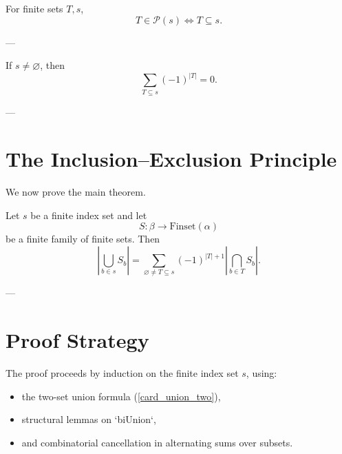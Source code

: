 \begin{lemma}\label{mem_powerset}
For finite sets \(T,s\),
\[
T \in \mathcal P(s)
\iff
T \subseteq s.
\]
\end{lemma}


---

\begin{lemma}\label{alternating_sum_powerset}
If \(s \neq \varnothing\), then
\[
\sum_{T \subseteq s} (-1)^{|T|}
=
0.
\]
\end{lemma}


---

\section{The Inclusion--Exclusion Principle}

We now prove the main theorem.

\begin{theorem}\label{inclusion_exclusion}
Let \(s\) be a finite index set and let
\[
S : \beta \to \mathrm{Finset}(\alpha)
\]
be a finite family of finite sets. Then
\[
\left|
\bigcup_{b \in s} S_b
\right|
=
\sum_{\varnothing \neq T \subseteq s}
(-1)^{|T|+1}
\left|
\bigcap_{b \in T} S_b
\right|.
\]
\end{theorem}


---

\section{Proof Strategy}

The proof proceeds by induction on the finite index set \(s\),
using:
\begin{itemize}
\item the two-set union formula (\ref{card_union_two}),
\item structural lemmas on `biUnion`,
\item and combinatorial cancellation in alternating sums over subsets.
\end{itemize}